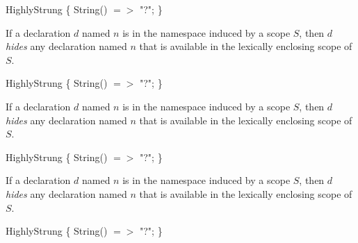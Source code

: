 \documentclass{article}
\begin{document}
\begin{dartCode}
\CLASS{} HighlyStrung \{
  String() $=>$ "?";
\}
\end{dartCode}

\LMHash{}
If a  declaration $d$ named $n$ is in the namespace induced by a scope $S$, then $d$ {\em hides} any declaration named $n$ that is available in the lexically enclosing scope of $S$.

\commentary {%
New paragraph.

New paragraph new paragraph new paragraph new paragraph new paragraph new paragraph new paragraph new paragraph new paragraph new paragraph new paragraph new paragraph new paragraph new paragraph new paragraph new paragraph new paragraph.

New paragraph,
new paragraph, and
new paragraph. %

  \rationale{nested rationale}

Naming conventions usually prevent such abuses. Nevertheless,the following program is legal:
}

\begin{dartCode}
\CLASS{} HighlyStrung \{
  String() $=>$ "?";
\}
\end{dartCode}

\LMHash{}
If a  declaration $d$ named $n$ is in the namespace induced by a scope $S$, then $d$ {\em hides} any declaration named $n$ that is available in the lexically enclosing scope of $S$.

\begin{dartCode}
\CLASS{} HighlyStrung \{
  String() $=>$ "?";
\}
\end{dartCode}

\LMHash{}
If a  declaration $d$ named $n$ is in the namespace induced by a scope $S$, then $d$ {\em hides} any declaration named $n$ that is available in the lexically enclosing scope of $S$.


\begin{dartCode}
      \CLASS{} HighlyStrung \{
                  String() $=>$ "?";
      \}
\end{dartCode}
\end{document}
